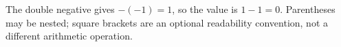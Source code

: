 The double negative gives $-(-1)=1$, so the value is $1-1=\boxed0$. Parentheses may be nested; square brackets are an optional readability convention, not a different arithmetic operation.
